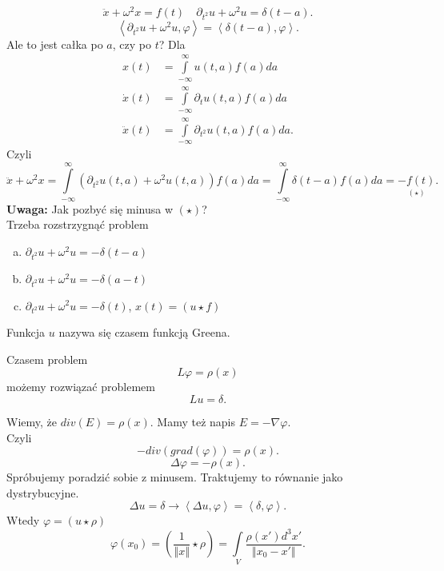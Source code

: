 \documentclass[../main.tex]{subfiles}
\begin{document}
\begin{przyklad}
    \[
        \ddot{x} + \omega^2 x = f(t)\quad \partial_{t^2}u + \omega^2 u = \delta(t-a)
    .\]
\[
    \left<\partial_{t^2}u + \omega^2 u , \varphi \right> = \left<\delta(t-a), \varphi \right>
.\]
Ale to jest całka po $a$, czy po $t$?
Dla
\begin{align*}
    x(t) &= \int\limits_{-\infty}^{\infty} u(t,a)f(a)da\\
    \dot{x}(t) &= \int\limits_{-\infty}^{\infty} \partial_t u(t,a)f(a)da\\
    \ddot{x}(t) &= \int\limits_{-\infty}^{\infty} \partial_{t^2}u(t,a)f(a)da
.\end{align*}
Czyli
\[
    \ddot{x} + \omega^2 x = \int\limits_{-\infty}^{\infty} \left( \partial_{t^2}u(t,a) + \omega^2 u(t,a) \right) f(a)da = \int\limits_{-\infty}^{\infty} \delta(t-a)f(a)da = \underset{(\star)}{-f(t)}
.\]
\textbf{Uwaga:} Jak pozbyć się minusa w $(\star)$?\\
    Trzeba rozstrzygnąć problem
        \begin{enumerate}[a)]
            \item $\partial_{t^2}u + \omega^2 u = -\delta(t-a)$
            \item $\partial_{t^2}u + \omega^2 u = -\delta(a-t)$
            \item $\partial_{t^2}u + \omega^2 u = -\delta(t)$, $x(t) = (u\star f)$
        \end{enumerate}
    Funkcja $u$ nazywa się czasem {\color{green}funkcją Greena}.
\end{przyklad}
\begin{przyklad}
    Czasem problem
    \[
        L \varphi = \rho(x)
    \]
    możemy rozwiązać problemem
    \[
        L u = \delta
    .\]
\end{przyklad}
\begin{przyklad}
    Wiemy, że $div(E) = \rho(x)$. Mamy też napis $E = - \nabla \varphi$.\\
    Czyli
    \[
        -div(grad(\varphi)) = \rho(x)
    .\]
\[
    \Delta \varphi = -\rho(x)
.\]
Spróbujemy poradzić sobie z minusem. Traktujemy to równanie jako dystrybucyjne.
\[
    \Delta u = \delta \longrightarrow \left<\Delta u, \varphi \right> = \left<\delta, \varphi \right>
.\]
Wtedy $\varphi = (u\star \rho)$
\[
    \varphi(x_0) = \left( \frac{1}{\left\Vert x \right\Vert }\star \rho \right) = \int\limits_{V}\frac{\rho(x')d^3x'}{\left\Vert x_0 - x' \right\Vert }
.\]
\end{przyklad}
\end{document}
